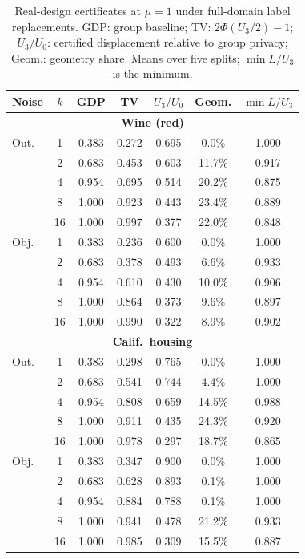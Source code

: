 \begin{table}[t]
\centering
\caption{Real-design certificates at $\mu=1$ under full-domain label replacements. GDP: group baseline; TV: $2\Phi(U_3/2)-1$; $U_3/U_0$: certified displacement relative to group privacy; Geom.: geometry share. Means over five splits; $\min L/U_3$ is the minimum.}
\label{tab:real-design}
\footnotesize
\setlength{\tabcolsep}{4pt}
\begin{tabular}{lcccccc}
\toprule
Noise & $k$ & GDP & TV & $U_3/U_0$ & Geom. & $\min L/U_3$ \\
\midrule
\multicolumn{7}{c}{\textbf{Wine (red)}} \\
\midrule
Out. & 1 & 0.383 & 0.272 & 0.695 & 0.0\% & 1.000 \\
     & 2 & 0.683 & 0.453 & 0.603 & 11.7\% & 0.917 \\
     & 4 & 0.954 & 0.695 & 0.514 & 20.2\% & 0.875 \\
     & 8 & 1.000 & 0.923 & 0.443 & 23.4\% & 0.889 \\
     & 16 & 1.000 & 0.997 & 0.377 & 22.0\% & 0.848 \\
\addlinespace
Obj. & 1 & 0.383 & 0.236 & 0.600 & 0.0\% & 1.000 \\
     & 2 & 0.683 & 0.378 & 0.493 & 6.6\% & 0.933 \\
     & 4 & 0.954 & 0.610 & 0.430 & 10.0\% & 0.906 \\
     & 8 & 1.000 & 0.864 & 0.373 & 9.6\% & 0.897 \\
     & 16 & 1.000 & 0.990 & 0.322 & 8.9\% & 0.902 \\
\midrule
\multicolumn{7}{c}{\textbf{Calif.\ housing}} \\
\midrule
Out. & 1 & 0.383 & 0.298 & 0.765 & 0.0\% & 1.000 \\
     & 2 & 0.683 & 0.541 & 0.744 & 4.4\% & 1.000 \\
     & 4 & 0.954 & 0.808 & 0.659 & 14.5\% & 0.988 \\
     & 8 & 1.000 & 0.911 & 0.435 & 24.3\% & 0.920 \\
     & 16 & 1.000 & 0.978 & 0.297 & 18.7\% & 0.865 \\
\addlinespace
Obj. & 1 & 0.383 & 0.347 & 0.900 & 0.0\% & 1.000 \\
     & 2 & 0.683 & 0.628 & 0.893 & 0.1\% & 1.000 \\
     & 4 & 0.954 & 0.884 & 0.788 & 0.1\% & 1.000 \\
     & 8 & 1.000 & 0.941 & 0.478 & 21.2\% & 0.933 \\
     & 16 & 1.000 & 0.985 & 0.309 & 15.5\% & 0.887 \\
\bottomrule
\end{tabular}
\end{table}
